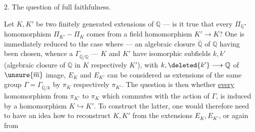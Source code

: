 2. The question of full faithfulness.

Let $K,K'$ be two finitely generated extensions of $\mathbb Q$ --- is it true that every $\Pi_{\mathbb Q}$-homomorphism $\Pi_{K'}-\Pi_K$ comes from a field homomorphism $K'\longrightarrow K$? One is immediately reduced to the case where --- an algebraic closure $\overline{\mathbb Q}$ of $\mathbb Q$ having been chosen, whence a $\Gamma_{\overline{\mathbb Q}/\mathbb Q}$ --- $K$ and $K'$ have isomorphic subfields $k,k'$ (algebraic closure of $\mathbb Q$ in $K$ respectively $K'$), with   $k,\deleted{k'}\longrightarrow\mathbb Q$ of $\unsure{\overline m}$ image,  $E_K$ and $E_{K'}$ can be considered as extensions of the same group $\Gamma=\Gamma_{\overline{\mathbb Q}/k}$ by $\pi_K$ respectively $\pi_{K'}$. The question is then whether \uline{every} homomorphism from $\pi_{K'}$ to $\pi_K$ which commutes with the action of $\Gamma$, is induced by a homomorphism $K\hookrightarrow K'$. To construct the latter, one would therefore need to have an idea how to reconstruct $K,K'$ from the extensions $E_K,E_{K'}$, or again from
